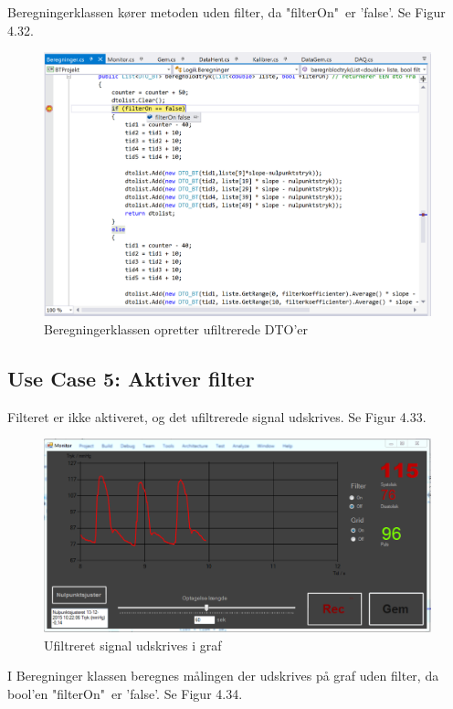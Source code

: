 Beregningerklassen kører metoden uden filter, da "filterOn"\ er 'false'. Se Figur 4.32.

\begin{figure}[H]
	\centering
	\includegraphics[width=1\textwidth]{Figurer/Test_Deaktiver_4}
	\caption{Beregningerklassen opretter ufiltrerede DTO'er}
\end{figure}

\subsection{Use Case 5: Aktiver filter}

Filteret er ikke aktiveret, og det ufiltrerede signal udskrives. Se Figur 4.33.

\begin{figure}[H]
	\centering
	\includegraphics[width=1\textwidth]{Figurer/Test_Aktiver_1}
	\caption{Ufiltreret signal udskrives i graf}
\end{figure}

I Beregninger klassen beregnes målingen der udskrives på graf uden filter, da bool'en "filterOn"\ er 'false'. Se Figur 4.34.

